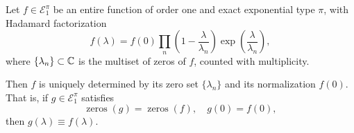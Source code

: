\begin{lemma}
\label{lem:hadamard_uniqueness_E1pi}
Let \( f \in \mathcal{E}_1^\pi \) be an entire function of order one and exact exponential type \( \pi \), with Hadamard factorization
\[
f(\lambda) = f(0) \prod_n \left( 1 - \frac{\lambda}{\lambda_n} \right) \exp\left( \frac{\lambda}{\lambda_n} \right),
\]
where \( \{ \lambda_n \} \subset \mathbb{C} \) is the multiset of zeros of \( f \), counted with multiplicity.

Then \( f \) is uniquely determined by its zero set \( \{ \lambda_n \} \) and its normalization \( f(0) \). That is, if \( g \in \mathcal{E}_1^\pi \) satisfies
\[
\operatorname{zeros}(g) = \operatorname{zeros}(f), \quad g(0) = f(0),
\]
then \( g(\lambda) \equiv f(\lambda) \).
\end{lemma}
